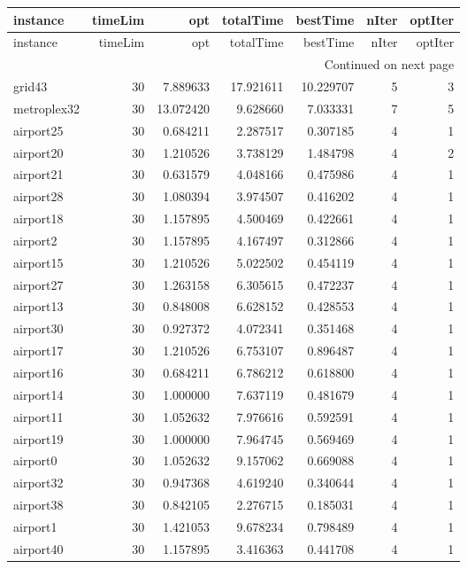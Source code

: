 \documentclass[../../../thesis.tex]{subfiles}
\begin{document}
\tiny
\begin{longtable}{|l|r|r|r|r|r|r|}
\toprule
instance & timeLim & opt & totalTime & bestTime & nIter & optIter \\
\midrule
\endfirsthead
\toprule
instance & timeLim & opt & totalTime & bestTime & nIter & optIter \\
\midrule
\endhead
\midrule
\multicolumn{7}{r}{Continued on next page} \\
\midrule
\endfoot
\bottomrule
\endlastfoot
grid43 & 30 & 7.889633 & 17.921611 & 10.229707 & 5 & 3 \\
metroplex32 & 30 & 13.072420 & 9.628660 & 7.033331 & 7 & 5 \\
airport25 & 30 & 0.684211 & 2.287517 & 0.307185 & 4 & 1 \\
airport20 & 30 & 1.210526 & 3.738129 & 1.484798 & 4 & 2 \\
airport21 & 30 & 0.631579 & 4.048166 & 0.475986 & 4 & 1 \\
airport28 & 30 & 1.080394 & 3.974507 & 0.416202 & 4 & 1 \\
airport18 & 30 & 1.157895 & 4.500469 & 0.422661 & 4 & 1 \\
airport2 & 30 & 1.157895 & 4.167497 & 0.312866 & 4 & 1 \\
airport15 & 30 & 1.210526 & 5.022502 & 0.454119 & 4 & 1 \\
airport27 & 30 & 1.263158 & 6.305615 & 0.472237 & 4 & 1 \\
airport13 & 30 & 0.848008 & 6.628152 & 0.428553 & 4 & 1 \\
airport30 & 30 & 0.927372 & 4.072341 & 0.351468 & 4 & 1 \\
airport17 & 30 & 1.210526 & 6.753107 & 0.896487 & 4 & 1 \\
airport16 & 30 & 0.684211 & 6.786212 & 0.618800 & 4 & 1 \\
airport14 & 30 & 1.000000 & 7.637119 & 0.481679 & 4 & 1 \\
airport11 & 30 & 1.052632 & 7.976616 & 0.592591 & 4 & 1 \\
airport19 & 30 & 1.000000 & 7.964745 & 0.569469 & 4 & 1 \\
airport0 & 30 & 1.052632 & 9.157062 & 0.669088 & 4 & 1 \\
airport32 & 30 & 0.947368 & 4.619240 & 0.340644 & 4 & 1 \\
airport38 & 30 & 0.842105 & 2.276715 & 0.185031 & 4 & 1 \\
airport1 & 30 & 1.421053 & 9.678234 & 0.798489 & 4 & 1 \\
airport40 & 30 & 1.157895 & 3.416363 & 0.441708 & 4 & 1 \\

\end{longtable}
\end{document}

